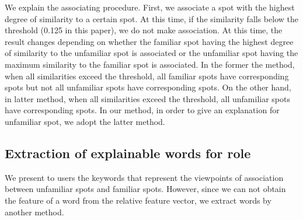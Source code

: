 \documentclass[journal]{IAENGtran}
\begin{document}
We explain the associating procedure. First, we associate a spot with the highest degree of similarity to a certain spot. At this time, if the similarity falls below the threshold (0.125 in this paper), we do not make association.
At this time, the result changes depending on whether the familiar spot having the highest degree of similarity to the unfamiliar spot is associated or the unfamiliar spot having the maximum similarity to the familiar spot is associated.
%
In the former the method, when all similarities exceed the threshold, all familiar spots have corresponding spots but not all unfamiliar spots have corresponding spots.
On the other hand, in latter method, when all similarities exceed the threshold, all unfamiliar spots have corresponding spots.
In our method, in order to give an explanation for unfamiliar spot, we adopt the latter method.

\subsection{Extraction of explainable words for role}
\label{subsec:Extraction of explainable words for role}
We present to users the keywords that represent the viewpoints of association between unfamiliar spots and familiar spots.
However, since we can not obtain the feature of a word from the relative feature vector, we extract words by another method.
\end{document}
